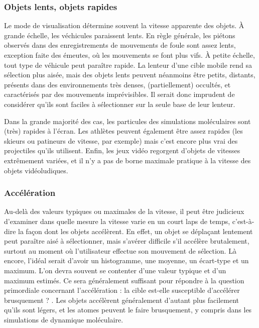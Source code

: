 	\FloatBarrier \subsubsection{Objets lents, objets rapides}
	Le mode de visualisation détermine souvent la vitesse apparente des objets. À grande échelle, les véchicules paraissent lents. En règle générale, les piétons observés dans des enregistrements de mouvements de foule sont assez lents, exception faite des émeutes, où les mouvements se font plus vifs. À petite échelle, tout type de véhicule peut paraître rapide. La lenteur d'une cible mobile rend sa sélection plus aisée, mais des objets lents peuvent néanmoins être petits, distants, présents dans des environnements très denses, (partiellement) occultés, et caractérisés par des mouvements imprévisibles. Il serait donc imprudent de considérer qu'ils sont \og faciles \fg{} à sélectionner sur la seule base de leur lenteur.
	
	Dans la grande majorité des cas, les particules des simulations moléculaires sont (très) rapides à l'écran. Les athlètes peuvent également être assez rapides (les skieurs ou patineurs de vitesse, par exemple) mais c'est encore plus vrai des projectiles qu'ils utilisent. Enfin, les jeux vidéo regorgent d'objets de vitesses extrêmement variées, et il n'y a pas de borne maximale pratique à la vitesse des objets vidéoludiques.
	
	\FloatBarrier \subsubsection{Accélération}
	Au-delà des valeurs typiques ou maximales de la vitesse, il peut être judicieux d'examiner dans quelle mesure la vitesse varie en un court laps de temps, c'est-à-dire la façon dont les objets accélèrent. En effet, un objet se déplaçant lentement peut paraître aisé à sélectionner, mais s'avérer difficile s'il accélère brutalement, surtout au moment où l'utilisateur effectue son mouvement de sélection. Là encore, l'idéal serait d'avoir un histogramme, une moyenne, un écart-type et un maximum. L'on devra souvent se contenter d'une valeur typique et d'un maximum estimés. Ce sera généralement suffisant pour répondre à la question primordiale concernant l'accélération : \og la cible est-elle susceptible d'accélérer brusquement ? \fg{}. Les objets accélèrent généralement d'autant plus facilement qu'ils sont légers, et les atomes peuvent le faire brusquement, y compris dans les simulations de dynamique moléculaire.

